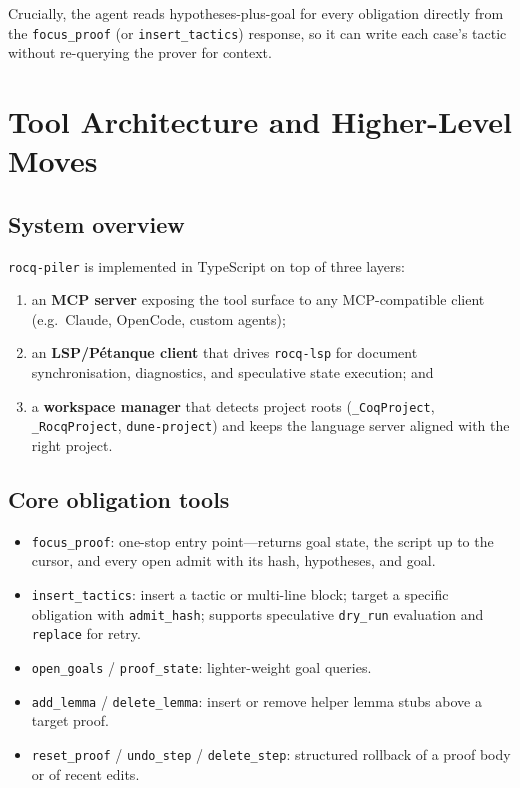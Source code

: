 \documentclass[11pt,a4paper]{article}
\newcommand{\tool}{\texttt{rocq-piler}\xspace}
\begin{document}
Crucially, the agent reads hypotheses-plus-goal for every obligation directly
from the \texttt{focus\_proof} (or \texttt{insert\_tactics}) response, so it can
write each case's tactic without re-querying the prover for context.

\section{Tool Architecture and Higher-Level Moves}
\label{sec:tools}

\subsection{System overview}

\tool is implemented in TypeScript on top of three layers:

\begin{enumerate}
\item an \textbf{MCP server} exposing the tool surface to any MCP-compatible
  client (e.g.\ Claude, OpenCode, custom agents);
\item an \textbf{LSP/Pétanque client} that drives \texttt{rocq-lsp} for document
  synchronisation, diagnostics, and speculative state execution; and
\item a \textbf{workspace manager} that detects project roots
  (\texttt{\_CoqProject}, \texttt{\_RocqProject}, \texttt{dune-project}) and
  keeps the language server aligned with the right project.
\end{enumerate}

\subsection{Core obligation tools}

\begin{itemize}
\item \texttt{focus\_proof}: one-stop entry point---returns goal state, the
  script up to the cursor, and every open admit with its hash, hypotheses, and
  goal.
\item \texttt{insert\_tactics}: insert a tactic or multi-line block; target a
  specific obligation with \texttt{admit\_hash}; supports speculative
  \texttt{dry\_run} evaluation and \texttt{replace} for retry.
\item \texttt{open\_goals} / \texttt{proof\_state}: lighter-weight goal queries.
\item \texttt{add\_lemma} / \texttt{delete\_lemma}: insert or remove helper
  lemma stubs above a target proof.
\item \texttt{reset\_proof} / \texttt{undo\_step} / \texttt{delete\_step}:
  structured rollback of a proof body or of recent edits.
\end{itemize}
\end{document}
